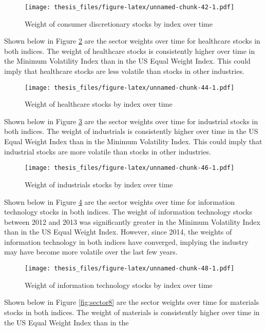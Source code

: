 \documentclass[12pt,twoside]{reedthesis}
\theoremstyle{definition}
\theoremstyle{definition}
\theoremstyle{definition}
\theoremstyle{remark}
\begin{document}
\begin{figure}[htbp]
\centering
\texttt{[image: thesis\_files/figure-latex/unnamed-chunk-42-1.pdf]}
\caption{\label{fig:unnamed-chunk-42}Weight of consumer discretionary stocks
by index over time\label{fig:sector4}}
\end{figure}
\newline
Shown below in Figure \ref{fig:sector5} are the sector weights over time
for healthcare stocks in both indices. The weight of healthcare stocks
is consistently higher over time in the Minimum Volatility Index than in
the US Equal Weight Index. This could imply that healthcare stocks are
less volatile than stocks in other industries.
\begin{figure}[htbp]
\centering
\texttt{[image: thesis\_files/figure-latex/unnamed-chunk-44-1.pdf]}
\caption{\label{fig:unnamed-chunk-44}Weight of healthcare stocks by index
over time\label{fig:sector5}}
\end{figure}
\clearpage
Shown below in Figure \ref{fig:sector6} are the sector weights over time
for industrial stocks in both indices. The weight of industrials is
consistently higher over time in the US Equal Weight Index than in the
Minimum Volatility Index. This could imply that industrial stocks are
more volatile than stocks in other industries.
\begin{figure}[htbp]
\centering
\texttt{[image: thesis\_files/figure-latex/unnamed-chunk-46-1.pdf]}
\caption{\label{fig:unnamed-chunk-46}Weight of industrials stocks by index
over time\label{fig:sector6}}
\end{figure}
\newline
Shown below in Figure \ref{fig:sector7} are the sector weights over time
for information technology stocks in both indices. The weight of
information technology stocks between 2012 and 2013 was significantly
greater in the Minimum Volatility Index than in the US Equal Weight
Index. However, since 2014, the weights of information technology in
both indices have converged, implying the industry may have become more
volatile over the last few years.
\begin{figure}[htbp]
\centering
\texttt{[image: thesis\_files/figure-latex/unnamed-chunk-48-1.pdf]}
\caption{\label{fig:unnamed-chunk-48}Weight of information technology stocks
by index over time\label{fig:sector7}}
\end{figure}
\clearpage
Shown below in Figure \ref{fig:sector8} are the sector weights over time
for materials stocks in both indices. The weight of materials is
consistently higher over time in the US Equal Weight Index than in the
\end{document}
